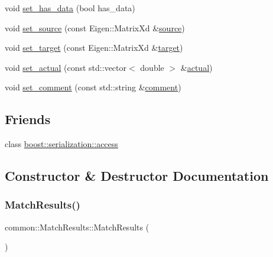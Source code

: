 \begin{DoxyCompactItemize}
void \hyperlink{classcommon_1_1MatchResults_aefc957f33852ec0b2c6ce3732ad28f58}{set\+\_\+has\+\_\+data} (bool has\+\_\+data)
\item 
void \hyperlink{classcommon_1_1MatchResults_a409305a6a8eedf233b429a4c77fd4bcf}{set\+\_\+source} (const Eigen\+::\+Matrix\+Xd \&\hyperlink{classcommon_1_1MatchResults_aee873ffecdcfb1c00c520326eb24d43e}{source})
\item 
void \hyperlink{classcommon_1_1MatchResults_a1a37ed44f6684609ee7416824eb884e1}{set\+\_\+target} (const Eigen\+::\+Matrix\+Xd \&\hyperlink{classcommon_1_1MatchResults_a4eccb30043877c55780aa935a404e8af}{target})
\item 
void \hyperlink{classcommon_1_1MatchResults_ab87b887370037de7ae611be2420071a8}{set\+\_\+actual} (const std\+::vector$<$ double $>$ \&\hyperlink{classcommon_1_1MatchResults_a51a4a0076719e2ab140cb223fc7f414c}{actual})
\item 
void \hyperlink{classcommon_1_1MatchResults_a2e4d287fb5ceb112d09cf564b334bb5b}{set\+\_\+comment} (const std\+::string \&\hyperlink{classcommon_1_1MatchResults_a872852821e248926ff428de5e8bf24d6}{comment})
\end{DoxyCompactItemize}
\subsection*{Friends}
\begin{DoxyCompactItemize}
\item 
class \hyperlink{classcommon_1_1MatchResults_ac98d07dd8f7b70e16ccb9a01abf56b9c}{boost\+::serialization\+::access}
\end{DoxyCompactItemize}


\subsection{Constructor \& Destructor Documentation}
\mbox{\label{classcommon_1_1MatchResults_a61b5ade3dc8c0f5ec8cc1a28d66316d9}} 
\subsubsection{\texorpdfstring{Match\+Results()}{MatchResults()}}
{\footnotesize\ttfamily common\+::\+Match\+Results\+::\+Match\+Results (\begin{DoxyParamCaption}{ }\end{DoxyParamCaption})\hspace{0.3cm}{\ttfamily [inline]}}



